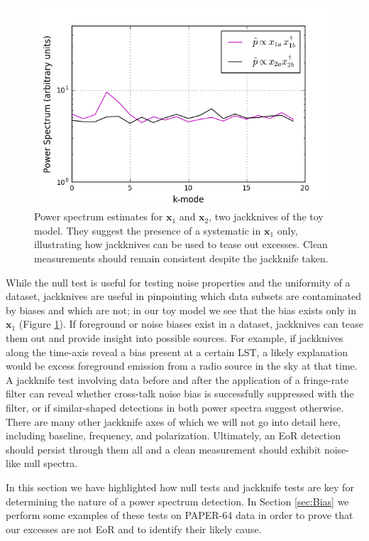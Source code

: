 \documentclass[preprint2,numberedappendix,tighten]{aastex6}  %
\begin{document}
\begin{figure}
	\centering
	\includegraphics[trim={0.3cm 0cm 0.3cm 0.3cm},width=\columnwidth]{plots/toy_bias2.png}
	\caption{Power spectrum estimates for $\textbf{x}_{1}$ and $\textbf{x}_{2}$, two jackknives of the toy model. They suggest 
the presence of a systematic in $\textbf{x}_{1}$ only, illustrating how jackknives can be used to tease out excesses. Clean 
measurements should remain consistent despite the jackknife taken.}
	\label{fig:toy_bias2}
\end{figure}

While the null test is useful for testing noise properties and the uniformity of a dataset, jackknives are useful in pinpointing 
which data subsets are contaminated by biases and which are not; in our toy model we see that the bias exists only in $
\textbf{x}_{1}$ (Figure \ref{fig:toy_bias2}). If foreground or noise biases exist in a dataset, jackknives can tease them out and 
provide insight into possible sources. For example, if jackknives along the time-axis reveal a bias present at a certain LST, a 
likely explanation would be excess foreground emission from a radio source in the sky at that time. A jackknife test involving 
data before and after the application of a fringe-rate filter can reveal whether cross-talk noise bias is successfully suppressed 
with the filter, or if similar-shaped detections in both power spectra suggest otherwise. There are many other jackknife axes of 
which we will not go into detail here, including baseline, frequency, and polarization. Ultimately, an EoR detection should persist 
through them all and a clean measurement should exhibit noise-like null spectra.

In this section we have highlighted how null tests and jackknife tests are key for determining the nature of a power spectrum 
detection. In Section \ref{sec:Bias} we perform some examples of these tests on PAPER-64 data in order to prove that our 
excesses are not EoR and to identify their likely cause. 
\end{document}
